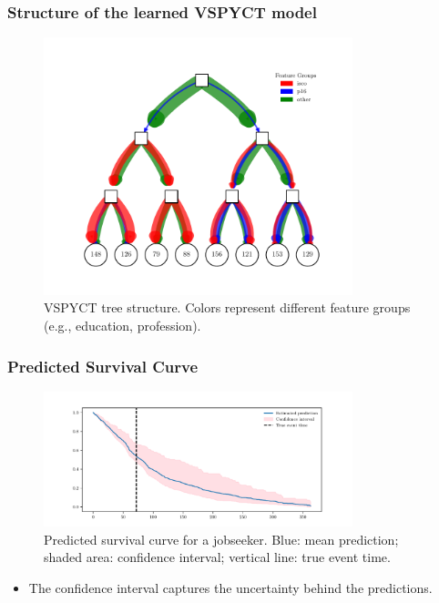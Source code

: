 \documentclass{beamer}
\begin{document}
\begin{frame}
  \frametitle{Structure of the learned VSPYCT model}
  \begin{figure}
    \centering
    \includegraphics[width=0.8\textwidth]{../figures/hecat_tree_old_temp.pdf}
    \caption{VSPYCT tree structure. Colors represent different feature groups (e.g., education, profession).}
  \end{figure}
\end{frame}


\begin{frame}
  \frametitle{Predicted Survival Curve}
  \begin{figure}
    \centering
    \includegraphics[width=0.8\textwidth]{../figures//pred_with_ci.pdf}
    \caption{Predicted survival curve for a jobseeker. Blue: mean prediction; shaded area: confidence interval; vertical line: true event time.}
  \end{figure}
  \begin{itemize}
    \item The confidence interval captures the uncertainty behind the predictions.
  \end{itemize}
\end{frame}
\end{document}
